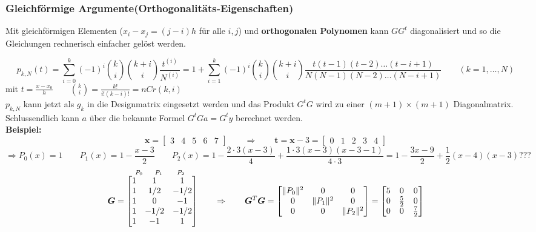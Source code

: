 \subsubsection{Gleichförmige Argumente\quad (Orthogonalitäts-Eigenschaften)} 
Mit gleichförmigen Elementen ($x_i - x_j = (j-i) h$ für alle $i,j$) und \textbf{orthogonalen Polynomen} kann 
$G G^t$ diagonalisiert und so die Gleichungen rechnerisch einfacher gelöst werden. 

$$\boxed{p_{k,N}(t) = \sum_{i=0}^k (-1)^i \binom{k}{i} \binom{k+i}{i} \frac{t^{(i)}}{N^{(i)}}= 
1+\sum_{i=1}^k (-1)^i \binom{k}{i} \binom{k+i}{i} \frac{t(t-1)(t-2)\ldots(t-i+1)}{N(N-1)(N-2)\ldots(N-i+1)} \qquad (k = 1,\ldots,N)}$$
mit $t=\frac{x-x_0}{h} \qquad \binom{k}{i}=\frac{k!}{i!(k-i)!}=nCr(k,i)$\\
$p_{k,N}$ kann jetzt als $g_{k}$ in die Designmatrix eingesetzt werden und das Produkt $G^t G$ wird 
zu einer $(m+1)\times(m+1)$ Diagonalmatrix. Schlussendlich kann $a$ über die bekannte Formel
$G^t G a = G^t y$ berechnet werden.\\

\textbf{Beispiel:}
$$\bm{x}=
	   \begin{bmatrix}
			3&4&5&6&7
	   \end{bmatrix}\qquad \Rightarrow\qquad \bm{t}=\bm{x}-3=
	   \begin{bmatrix}
	   		0&1&2&3&4
	   \end{bmatrix}$$
$$\Rightarrow P_0(x)=1 \qquad P_1(x)= 1-\frac{x-3}{2}\qquad P_2(x)=1-\frac{2\cdot 3 (x-3)}{4}+\frac{1 \cdot 3 (x-3)(x-3 -1)}{4 \cdot 3} = 1-\frac{3x-9}{2}+\frac 12 (x-4)(x-3)???$$
$$\overset{\hspace{0.6cm} P_0 \hspace{0.5cm} P_1 \hspace{0.6cm} P_2}{\bm{G} = \begin{bmatrix}
  1 & 1 	& 1\\
  1 & 1/2 	& -1/2\\
  1 & 0	  	& -1\\
  1 & -1/2 	& -1/2\\
  1 & -1 	& 1\\
\end{bmatrix}}\qquad \Rightarrow\qquad
\bm{G}^T\bm{G}=\begin{bmatrix}
 \| P_0\|^2 	& 0 	& 0\\
  0 		& \|P_1\|^2 	& 0\\
  0 		& 0	  	&\|P_2\|^2\\
\end{bmatrix}
= \begin{bmatrix}
  5 & 0 & 0 \\
  0 & \frac52 & 0\\
  0 & 0 & \frac{7} {2}\\
\end{bmatrix}
$$

